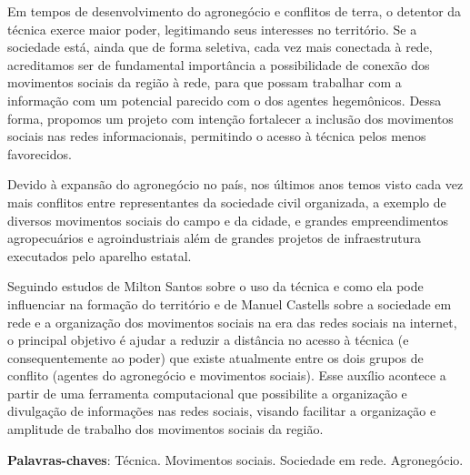 \begin{resumoumacoluna}
Em tempos de desenvolvimento do agronegócio e conflitos de terra, o detentor da técnica exerce maior poder, legitimando seus interesses no território. Se a sociedade está, ainda que de forma seletiva, cada vez mais conectada à rede, acreditamos ser de fundamental importância a possibilidade de conexão dos movimentos sociais da região à rede, para que possam trabalhar com a informação com um potencial parecido com o dos agentes hegemônicos. Dessa forma, propomos um projeto com intenção fortalecer a inclusão dos movimentos sociais nas redes informacionais, permitindo o acesso à técnica pelos menos favorecidos.

Devido à expansão do agronegócio no país, nos últimos anos temos visto cada vez mais conflitos entre representantes da sociedade civil organizada, a exemplo de diversos movimentos sociais do campo e da cidade, e grandes empreendimentos agropecuários e agroindustriais além de grandes projetos de infraestrutura executados pelo aparelho estatal.

Seguindo estudos de Milton Santos sobre o uso da técnica e como ela pode influenciar na formação do território e de Manuel Castells sobre a sociedade em rede e a organização dos movimentos sociais na era das redes sociais na internet, o principal objetivo é ajudar a reduzir a distância no acesso à técnica (e consequentemente ao poder) que existe atualmente entre os dois grupos de conflito (agentes do agronegócio e movimentos sociais). Esse auxílio acontece a partir de uma ferramenta computacional que possibilite a organização e divulgação de informações nas redes sociais, visando facilitar a organização e amplitude de trabalho dos movimentos sociais da região.

 \vspace{\onelineskip}
 \noindent
 \textbf{Palavras-chaves}: Técnica. Movimentos sociais. Sociedade em rede. Agronegócio.
\end{resumoumacoluna}

